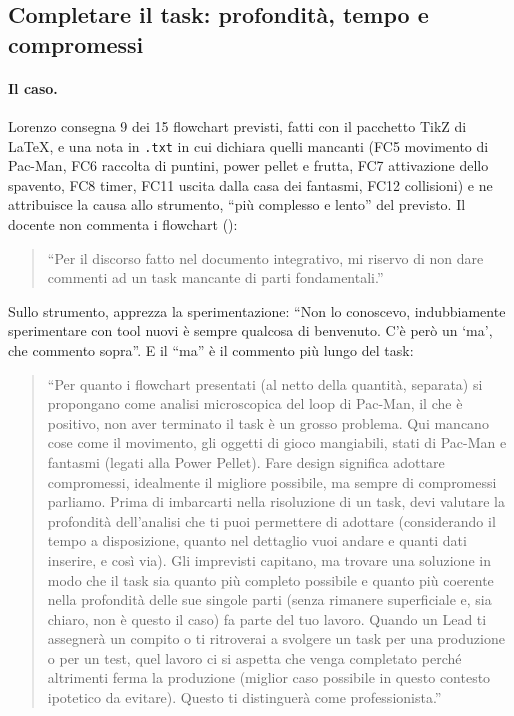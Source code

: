 \subsection{Completare il task: profondità, tempo e compromessi}
\label{rv:t4:sec:scope}

\paragraph{Il caso.} Lorenzo consegna 9 dei 15 flowchart previsti, fatti con
il pacchetto TikZ di \LaTeX{}, e una nota in \texttt{.txt} in cui dichiara
quelli mancanti (FC5 movimento di Pac-Man, FC6 raccolta di puntini, power
pellet e frutta, FC7 attivazione dello spavento, FC8 timer, FC11 uscita dalla
casa dei fantasmi, FC12 collisioni) e ne attribuisce la causa allo strumento,
``più complesso e lento'' del previsto. Il docente non commenta i flowchart
(\rvAvviso):
\begin{quote}
  ``Per il discorso fatto nel documento integrativo, mi riservo di non dare
  commenti ad un task mancante di parti fondamentali.''
\end{quote}
Sullo strumento, apprezza la sperimentazione: ``Non lo conoscevo, indubbiamente
sperimentare con tool nuovi è sempre qualcosa di benvenuto. C'è però un `ma',
che commento sopra''. E il ``ma'' è il commento più lungo del task:
\begin{quote}
  ``Per quanto i flowchart presentati (al netto della quantità, separata) si
  propongano come analisi microscopica del loop di Pac-Man, il che è
  positivo, non aver terminato il task è un grosso problema. Qui mancano cose
  come il movimento, gli oggetti di gioco mangiabili, stati di Pac-Man e
  fantasmi (legati alla Power Pellet). Fare design significa adottare
  compromessi, idealmente il migliore possibile, ma sempre di compromessi
  parliamo. Prima di imbarcarti nella risoluzione di un task, devi valutare la
  profondità dell'analisi che ti puoi permettere di adottare (considerando il
  tempo a disposizione, quanto nel dettaglio vuoi andare e quanti dati
  inserire, e così via). Gli imprevisti capitano, ma trovare una soluzione in
  modo che il task sia quanto più completo possibile e quanto più coerente
  nella profondità delle sue singole parti (senza rimanere superficiale e, sia
  chiaro, non è questo il caso) fa parte del tuo lavoro. Quando un Lead ti
  assegnerà un compito o ti ritroverai a svolgere un task per una produzione o
  per un test, quel lavoro ci si aspetta che venga completato perché
  altrimenti ferma la produzione (miglior caso possibile in questo contesto
  ipotetico da evitare). Questo ti distinguerà come professionista.''
\end{quote}

